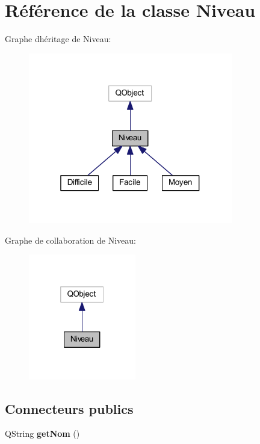 \hypertarget{class_niveau}{}\section{Référence de la classe Niveau}
\label{class_niveau}


Graphe d\textquotesingle{}héritage de Niveau\+:
\nopagebreak
\begin{figure}[H]
\begin{center}
\leavevmode
\includegraphics[width=253pt]{class_niveau__inherit__graph}
\end{center}
\end{figure}


Graphe de collaboration de Niveau\+:
\nopagebreak
\begin{figure}[H]
\begin{center}
\leavevmode
\includegraphics[width=133pt]{class_niveau__coll__graph}
\end{center}
\end{figure}
\subsection*{Connecteurs publics}
\begin{DoxyCompactItemize}
\item 
Q\+String {\bfseries get\+Nom} ()\hypertarget{class_niveau_a3b65ddce29136cdf442b27b6b4e4bc4f}{}\label{class_niveau_a3b65ddce29136cdf442b27b6b4e4bc4f}

\end{DoxyCompactItemize}
